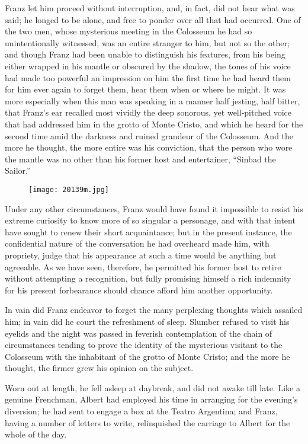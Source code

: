 Franz let him proceed without interruption, and, in fact, did not hear
what was said; he longed to be alone, and free to ponder over all that
had occurred. One of the two men, whose mysterious meeting in the
Colosseum he had so unintentionally witnessed, was an entire stranger
to him, but not so the other; and though Franz had been unable to
distinguish his features, from his being either wrapped in his mantle
or obscured by the shadow, the tones of his voice had made too powerful
an impression on him the first time he had heard them for him ever
again to forget them, hear them when or where he might. It was more
especially when this man was speaking in a manner half jesting, half
bitter, that Franz’s ear recalled most vividly the deep sonorous, yet
well-pitched voice that had addressed him in the grotto of Monte
Cristo, and which he heard for the second time amid the darkness and
ruined grandeur of the Colosseum. And the more he thought, the more
entire was his conviction, that the person who wore the mantle was no
other than his former host and entertainer, “Sinbad the Sailor.”

\begin{figure}[ht]
\texttt{[image: 20139m.jpg]}
\end{figure}

Under any other circumstances, Franz would have found it impossible to
resist his extreme curiosity to know more of so singular a personage,
and with that intent have sought to renew their short acquaintance; but
in the present instance, the confidential nature of the conversation he
had overheard made him, with propriety, judge that his appearance at
such a time would be anything but agreeable. As we have seen,
therefore, he permitted his former host to retire without attempting a
recognition, but fully promising himself a rich indemnity for his
present forbearance should chance afford him another opportunity.

In vain did Franz endeavor to forget the many perplexing thoughts which
assailed him; in vain did he court the refreshment of sleep. Slumber
refused to visit his eyelids and the night was passed in feverish
contemplation of the chain of circumstances tending to prove the
identity of the mysterious visitant to the Colosseum with the
inhabitant of the grotto of Monte Cristo; and the more he thought, the
firmer grew his opinion on the subject.

Worn out at length, he fell asleep at daybreak, and did not awake till
late. Like a genuine Frenchman, Albert had employed his time in
arranging for the evening’s diversion; he had sent to engage a box at
the Teatro Argentina; and Franz, having a number of letters to write,
relinquished the carriage to Albert for the whole of the day.

